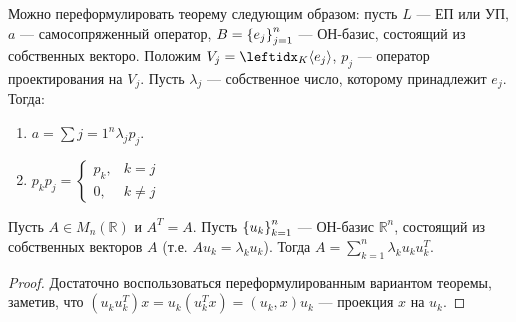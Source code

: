 \begin{rem}
    Можно переформулировать теорему следующим образом: пусть $L$ --- ЕП или УП, $a$ --- самосопряженный оператор, $B = \left\{e_j\right\}_{j=1}^{n}$ --- ОН-базис, состоящий из собственных векторо. Положим $V_j = \gen{K}{e_j}$, $p_j$ --- оператор проектирования на $V_j$. Пусть $\lambda_j$ --- собственное число, которому принадлежит $e_j$. Тогда:
    \begin{enumerate}
        \item $a = \sum{j=1}^n \lambda_j p_j$.
        \item $p_k p_j = \begin{cases}
            p_k, & k = j \\
            0,   & k \neq j
        \end{cases}$
    \end{enumerate}
\end{rem}

\begin{cor*}
    Пусть $A \in M_n(\mathbb{R})$ и $A^T = A$. Пусть $\left\{u_k\right\}_{k=1}^{n}$ --- ОН-базис $\mathbb{R}^n$, состоящий из собственных векторов $A$ (т.е. $Au_k = \lambda_k u_k$). Тогда $A = \sum_{k=1}^n \lambda_k u_k u_k^T$.
\end{cor*}

\begin{proof}
    Достаточно воспользоваться переформулированным вариантом теоремы, заметив, что $(u_ku_k^T)x = u_k(u_k^Tx) = (u_k, x)u_k$ --- проекция $x$ на $u_k$.
\end{proof}